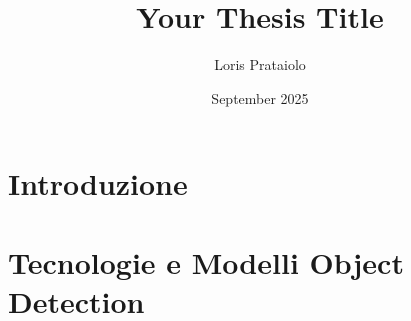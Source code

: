 \documentclass[a4paper,10pt]{report}
\title{Your Thesis Title}
\author{Loris Prataiolo}
\date{September 2025}
\begin{document}







\tableofcontents



\chapter{Introduzione}





\chapter{Tecnologie e Modelli Object Detection}



~\cite{*}


\end{document}
